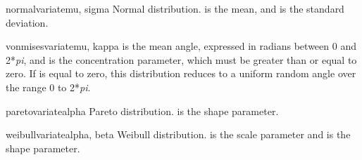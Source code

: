 \begin{funcdesc}{normalvariate}{mu, sigma}
  Normal distribution.   is the mean, and  is the
  standard deviation.
\end{funcdesc}

\begin{funcdesc}{vonmisesvariate}{mu, kappa}
   is the mean angle, expressed in radians between 0 and
  2*\emph{pi}, and  is the concentration parameter, which
  must be greater than or equal to zero.  If  is equal to
  zero, this distribution reduces to a uniform random angle over the
  range 0 to 2*\emph{pi}.
\end{funcdesc}

\begin{funcdesc}{paretovariate}{alpha}
  Pareto distribution.   is the shape parameter.
\end{funcdesc}

\begin{funcdesc}{weibullvariate}{alpha, beta}
  Weibull distribution.   is the scale parameter and
   is the shape parameter.
\end{funcdesc}


\begin{seealso}
\end{seealso}
